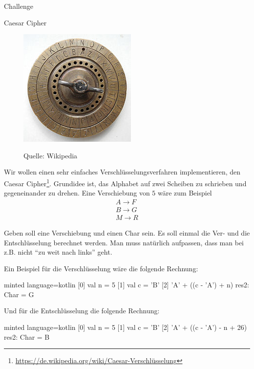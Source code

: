 \begin{task}[points=auto]{Challenge}
    \begin{subtask*}[points=0]{Caesar Cipher }
        \begin{figure}
            \begin{center}
            \includegraphics{caesar-cipher.jpg}
            \end{center}
            Quelle: Wikipedia
        \end{figure}
        Wir wollen einen sehr einfaches Verschlüsselungsverfahren implementieren, den Caesar Cipher\footnote{\url{https://de.wikipedia.org/wiki/Caesar-Verschlüsselung}}.
        Grundidee ist, das Alphabet auf zwei Scheiben zu schrieben und gegeneinander zu drehen.
        Eine Verschiebung von $5$ wäre zum Beispiel
        \begin{align*}
            A \to F \\
            B \to G \\
            M \to R
        \end{align*}

        Geben soll eine Verschiebung 
        und einen Char  sein.
        Es soll einmal die Ver- und die Entschlüsselung berechnet werden.
        Man muss natürlich aufpassen, dass man bei z.B.
         nicht \enquote{zu weit nach links} geht.

        \begin{solution}
            Ein Beispiel für die Verschlüsselung wäre die folgende Rechnung:
            \begin{codeBlock}[]{minted language=kotlin}
                [0] val n = 5
                [1] val c = 'B'
                [2] 'A' + ((c - 'A') + n) %
                res2: Char = G
            \end{codeBlock}
            Und für die Entschlüsselung die folgende Rechnung:
            \begin{codeBlock}[]{minted language=kotlin}
                [0] val n = 5
                [1] val c = 'B'
                [2] 'A' + ((c - 'A') - n + 26) %
                res2: Char = B
            \end{codeBlock}
        \end{solution}
    \end{subtask*}
\end{task}

